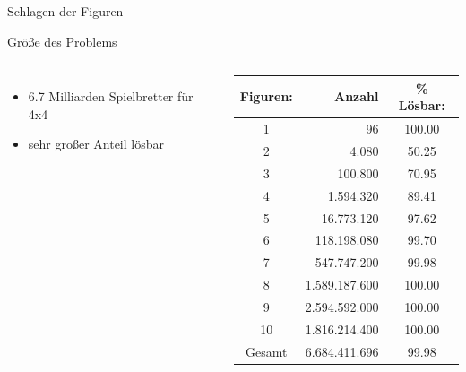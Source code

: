 \documentclass{beamer}
\begin{document}

\begin{frame}[allowframebreaks]{Schlagen der Figuren}
\Lst
\end{frame}




\begin{frame}{Größe des Problems}
\begin{columns}
		\begin{itemize}
			\item 6.7 Milliarden Spielbretter für 4x4
			\item sehr großer Anteil lösbar
				
			\end{itemize}

	\begin{center}
		\begin{tabular}{|c|r|c|} \hline
		Figuren:  & Anzahl & \% Lösbar:  \\ \hline \hline
		  1 & 96 &  100.00   \\ \hline
		  2 & 4.080 &   50.25   \\ \hline
		  3 & 100.800&   70.95   \\ \hline
		  4 & 1.594.320 &   89.41   \\ \hline
		  5 & 16.773.120&   97.62   \\ \hline
		  6 & 118.198.080&   99.70   \\ \hline
		  7 & 547.747.200&   99.98   \\ \hline
		  8 & 1.589.187.600 &  100.00   \\ \hline
		  9 & 2.594.592.000 &  100.00   \\ \hline
		 10 & 1.816.214.400 &  100.00   \\ \hline \hline
		  Gesamt  & 6.684.411.696 &  99.98   \\ \hline
		
		\end{tabular}
	\end{center}


\end{columns}
\end{frame}
\end{document}
